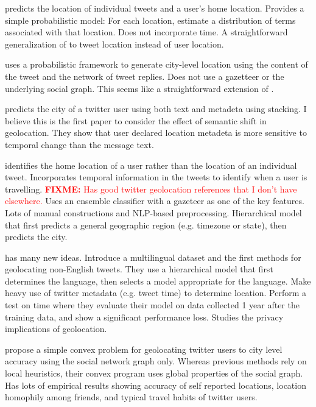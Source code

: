 \documentclass{article}
\newcommand{\fixme}[1]{\textcolor{red}{\textbf{FIXME:} {#1}}}
\begin{document}
\citet{kinsella2011m} predicts the location of individual tweets and a user's home location.
Provides a simple probabilistic model: 
For each location, estimate a distribution of terms associated with that location.
Does not incorporate time.
A straightforward generalization of \citet{cheng2010you} to tweet location instead of user location.

\citet{li2012towards} uses a probabilistic framework to generate city-level location using the content of the tweet and the network of tweet replies.
Does not use a gazetteer or the underlying social graph.
This seems like a straightforward extension of \citet{cheng2010you}.

\citet{han2013stacking} predicts the city of a twitter user using both text and metadeta using stacking.
I believe this is the first paper to consider the effect of semantic shift in geolocation.
They show that user declared location metadeta is more sensitive to temporal change than the message text.

\citet{mahmud2014home} identifies the home location of a user rather than the location of an individual tweet.
Incorporates temporal information in the tweets to identify when a user is travelling.
\fixme{Has good twitter geolocation references that I don't have elsewhere.}
Uses an ensemble classifier with a gazeteer as one of the key features.
Lots of manual constructions and NLP-based preprocessing.
Hierarchical model that first predicts a general geographic region (e.g. timezone or state), then predicts the city.

\citet{han2014text} has many new ideas.
Introduce a multilingual dataset and the first methods for geolocating non-English tweets.
They use a hierarchical model that first determines the language,
then selects a model appropriate for the language.
Make heavy use of twitter metadata (e.g. tweet time) to determine location.
Perform a test on time where they evaluate their model on data collected 1 year after the training data, and show a significant performance loss.
Studies the privacy implications of geolocation.

\citet{compton2014geotagging} propose a simple convex problem for geolocating twitter users to city level accuracy using the social network graph only.
Whereas previous methods rely on local heuristics, their convex program uses global properties of the social graph.
Has lots of empirical results showing accuracy of self reported locations, location homophily among friends, and typical travel habits of twitter users.
\end{document}
